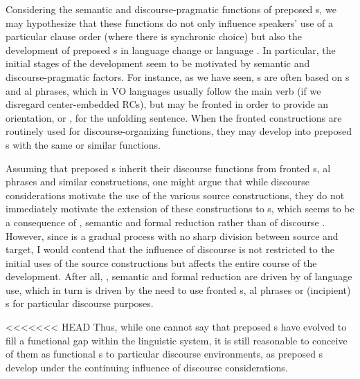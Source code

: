 \documentclass[output=paper]{langsci/langscibook}
\begin{document}
Considering the semantic and discourse-pragmatic functions of preposed s, we may hypothesize that these functions do not only influence speakers’ use of a particular clause order (where there is synchronic choice) but also the development of preposed s in language change or language . In particular, the initial stages of the development seem to be motivated by semantic and discourse-pragmatic factors. For instance, as we have seen, s are often based on s and al phrases, which in VO languages usually follow the main verb (if we disregard center-embedded RCs), but may be fronted in order to provide an orientation, or , for the unfolding sentence. When the fronted constructions are routinely used for discourse-organizing functions, they may develop into preposed s with the same or similar functions. 

Assuming that preposed s inherit their discourse functions from fronted s, al phrases and similar constructions, one might argue that while discourse considerations motivate the use of the various source constructions, they do not immediately motivate the extension of these constructions to s, which 
\label{p:xxx:automatization}
seems to be a consequence of , semantic  and formal reduction rather than of discourse . However, since  is a gradual process with no sharp division between source and target, I would contend that the influence of discourse is not restricted to the initial uses of the source constructions but affects the entire course of the development. After all, , semantic  and formal reduction are driven by  of language use, which in turn is driven by the need to use fronted s, al phrases or (incipient) s for particular discourse purposes.

<<<<<<< HEAD
Thus, while one cannot say that preposed s have evolved to fill a functional gap within the linguistic system, it is still reasonable to conceive of them as functional s to particular discourse environments, as preposed s develop under the continuing influence of discourse considerations.
\end{document}
